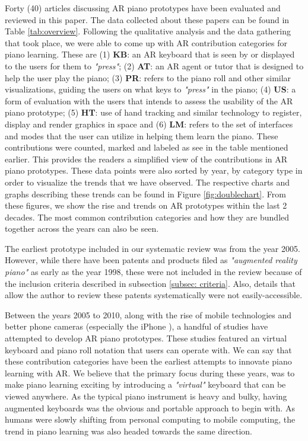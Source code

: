 \documentclass[manuscript,screen]{acmart}
\begin{document}
\label{sec: trends}
Forty (40) articles discussing AR piano prototypes have been evaluated and reviewed in this paper. The data collected about these papers can be found in Table \ref{tab:overview}. Following the qualitative analysis and the data gathering that took place, we were able to come up with AR contribution categories for piano learning. These are (1) \textbf{KB}: an AR keyboard that is seen by or displayed to the users for them to \textit{"press"}; (2) \textbf{AT}: an AR agent or tutor that is designed to help the user play the piano; (3) \textbf{PR}: refers to the piano roll and other similar visualizations, guiding the users on what keys to  \textit{"press"} in the piano; (4) \textbf{US}: a form of evaluation with the users that intends to assess the usability of the AR piano prototype; (5) \textbf{HT}: use of hand tracking and similar technology to register, display and render graphics in space and (6) \textbf{LM}: refers to the set of interfaces and modes that the user can utilize in helping them learn the piano. These contributions were counted, marked and labeled as see in the table mentioned earlier. This provides the readers a simplified view of the contributions in AR piano prototypes. These data points were also sorted by year, by category type in order to visualize the trends that we have observed. The respective charts and graphs describing these trends can be found in Figure \ref{fig:doublechart}. From these figures, we show the rise and trends on AR prototypes within the last 2 decades. The most common contribution categories and how they are bundled together across the years can also be seen. 

The earliest prototype included in our systematic review was from the year 2005. However, while there have been patents and products filed as \textit{"augmented reality piano"} as early as the year 1998, these were not included in the review because of the inclusion criteria described in subsection \ref{subsec: criteria}. Also, details that allow the author to review these patents systematically were not easily-accessible.

Between the years 2005 to 2010, along with the rise of mobile technologies and better phone cameras (especially the iPhone \cite{querashi2012apple}), a handful of studies have attempted to develop AR piano prototypes. These studies featured an virtual keyboard and piano roll notation that users can operate with. We can say that these contribution categories have been the earliest attempts to innovate piano learning with AR. We believe that the primary focus during these years, was to make piano learning exciting by introducing a \textit{"virtual"} keyboard that can be viewed anywhere. As the typical piano instrument is heavy and bulky, having augmented keyboards was the obvious and portable approach to begin with. As humans were slowly shifting from personal computing to mobile computing, the trend in piano learning was also headed towards the same direction.
\end{document}
